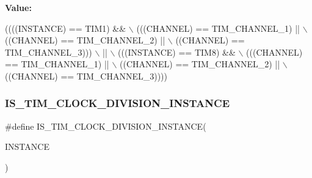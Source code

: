 {\bfseries Value\+:}
\begin{DoxyCode}
((((INSTANCE) == TIM1) &&                    \(\backslash\)
     (((CHANNEL) == TIM\_CHANNEL\_1) ||           \(\backslash\)
      ((CHANNEL) == TIM\_CHANNEL\_2) ||           \(\backslash\)
      ((CHANNEL) == TIM\_CHANNEL\_3)))            \(\backslash\)
    ||                                          \(\backslash\)
    (((INSTANCE) == TIM8) &&                    \(\backslash\)
     (((CHANNEL) == TIM\_CHANNEL\_1) ||           \(\backslash\)
      ((CHANNEL) == TIM\_CHANNEL\_2) ||           \(\backslash\)
      ((CHANNEL) == TIM\_CHANNEL\_3))))
\end{DoxyCode}
\mbox{\label{group___exported__macros_gac54b9f42e8ab07c41abe7d96d13d698a}} 
\subsubsection{\texorpdfstring{I\+S\+\_\+\+T\+I\+M\+\_\+\+C\+L\+O\+C\+K\+\_\+\+D\+I\+V\+I\+S\+I\+O\+N\+\_\+\+I\+N\+S\+T\+A\+N\+CE}{IS\_TIM\_CLOCK\_DIVISION\_INSTANCE}}
{\footnotesize\ttfamily \#define I\+S\+\_\+\+T\+I\+M\+\_\+\+C\+L\+O\+C\+K\+\_\+\+D\+I\+V\+I\+S\+I\+O\+N\+\_\+\+I\+N\+S\+T\+A\+N\+CE(\begin{DoxyParamCaption}\item[{}]{I\+N\+S\+T\+A\+N\+CE }\end{DoxyParamCaption})}

